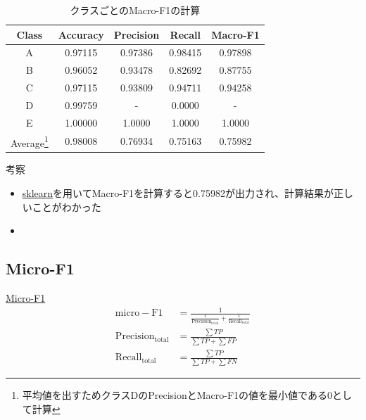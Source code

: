 \documentclass[leno,xcolor=dvipsnames]{beamer}
\begin{document}
  \begin{frame}
    \begin{table}[H]
      \centering
      \caption{クラスごとのMacro-F1の計算} \label{tb:macro-F1}
      \begin{tabular}{ccccc}
        \toprule
        Class & Accuracy & Precision & Recall & Macro-F1 \\
        \midrule
        A & 0.97115 & 0.97386 & 0.98415 & 0.97898 \\
        B & 0.96052 & 0.93478 & 0.82692 & 0.87755 \\
        C & 0.97115 & 0.93809 & 0.94711 & 0.94258 \\
        D & 0.99759 & - & 0.0000 & - \\
        E & 1.00000 & 1.0000 & 1.0000 & 1.0000 \\
        \midrule
        Average\footnote{平均値を出すためクラスDのPrecisionとMacro-F1の値を最小値である0として計算} & 0.98008 & 0.76934 & 0.75163 & 0.75982 \\
        \bottomrule
      \end{tabular}
    \end{table}
  \end{frame}

  \begin{frame}{考察}
    \begin{itemize}
      \item \href{https://scikit-learn.org/stable/modules/generated/sklearn.metrics.f1_score.html}{sklearn}を用いてMacro-F1を計算すると0.75982が出力され、計算結果が正しいことがわかった
      \item 
    \end{itemize}
  \end{frame}

  \begin{frame}
    \section{Micro-F1}
  \end{frame}
  
  \begin{frame}{\href{https://ebi-works.com/macrof1/#outline__1_2}{Micro-F1}}
    \begin{align*}
      \mathrm{micro-F1} &= \frac{1}{\frac{1}{\mathrm{Precision}_{\mathrm{total}}} + \frac{1}{\mathrm{Recall}_{\mathrm{total}}}} \\
      \mathrm{Precision}_{\mathrm{total}} &= \frac{\sum TP}{\sum TP + \sum FP} \\
      \mathrm{Recall}_{\mathrm{total}} &= \frac{\sum TP}{\sum TP + \sum FN}
    \end{align*}
  \end{frame}
\end{document}
